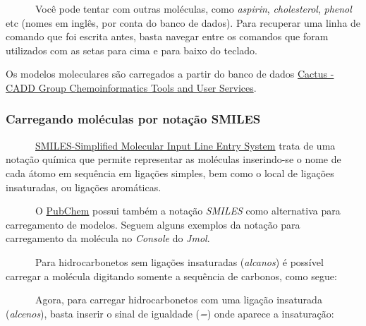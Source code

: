 \documentclass[
  letterpaper,
  DIV=11,
  numbers=noendperiod]{scrreprt}
\newenvironment{Shaded}{\begin{snugshade}}{\end{snugshade}}
\newcommand{\CommentTok}[1]{\textcolor[rgb]{0.37,0.37,0.37}{#1}}
\newcommand{\NormalTok}[1]{\textcolor[rgb]{0.00,0.23,0.31}{#1}}
\newcommand{\SpecialCharTok}[1]{\textcolor[rgb]{0.37,0.37,0.37}{#1}}
\begin{document}
~~~~~~Você pode tentar com outras moléculas, como \emph{aspirin},
\emph{cholesterol}, \emph{phenol} etc (nomes em inglês, por conta do
banco de dados). Para recuperar uma linha de comando que foi escrita
antes, basta navegar entre os comandos que foram utilizados com as setas
para cima e para baixo do teclado.

Os modelos moleculares são carregados a partir do banco de dados
\href{https://cactus.nci.nih.gov/chemical/structure}{Cactus - CADD Group
Chemoinformatics Tools and User Services}.

\subsubsection{Carregando moléculas por notação
SMILES}\label{carregando-moluxe9culas-por-notauxe7uxe3o-smiles}

~~~~~~\href{https://pt.wikipedia.org/wiki/SMILES}{SMILES-Simplified
Molecular Input Line Entry System} trata de uma notação química que
permite representar as moléculas inserindo-se o nome de cada átomo em
sequência em ligações simples, bem como o local de ligações insaturadas,
ou ligações aromáticas.

~~~~~~O \href{https://pubchem.ncbi.nlm.nih.gov/}{PubChem} possui também
a notação \emph{SMILES} como alternativa para carregamento de modelos.
Seguem alguns exemplos da notação para carregamento da molécula no
\emph{Console} do \emph{Jmol}.

~~~~~~Para hidrocarbonetos sem ligações insaturadas (\emph{alcanos}) é
possível carregar a molécula digitando somente a sequência de carbonos,
como segue:

\begin{Shaded}
\end{Shaded}

\begin{Shaded}
\end{Shaded}

~~~~~~Agora, para carregar hidrocarbonetos com uma ligação insaturada
(\emph{alcenos}), basta inserir o sinal de igualdade (\emph{=}) onde
aparece a insaturação:
\end{document}
